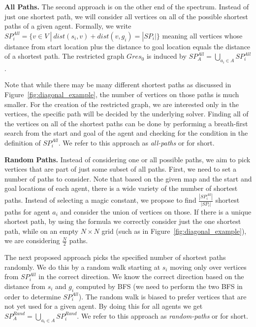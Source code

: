 \textbf{All Paths.}
The second approach is on the other end of the spectrum. Instead of just one shortest path, we will consider all vertices on all of the possible shortest paths of a given agent. Formally, we write $SP_i^{All} = \{ v \in V \: | \: dist(s_i,v) + dist(v,g_i) = |SP_i|\}$ meaning all vertices whose distance from start location plus the distance to goal location equals the distance of a shortest path. The restricted graph $Gres_{0}$ is induced by $SP_A^{All} = \bigcup_{a_i \in A} SP_i^{All}$.

Note that while there may be many different shortest paths as discussed in Figure~\ref{fig:diagonal_example}, the number of vertices on those paths is much smaller. For the creation of the restricted graph, we are interested only in the vertices, the specific path will be decided by the underlying solver. Finding all of the vertices on all of the shortest paths can be done by performing a breath-first search from the start and goal of the agent and checking for the condition in the definition of $SP_i^{All}$. We refer to this approach as \emph{all-paths} or \psa{} for short.




%
\textbf{Random Paths.}
Instead of considering one or all possible paths, we aim to pick vertices that are part of just some subset of all paths. First, we need to set a number of paths to consider. Note that based on the given map and the start and goal locations of each agent, there is a wide variety of the number of shortest paths. Instead of selecting a magic constant, we propose to find $\frac{|SP_i^{All}|}{|SP_i|}$ shortest paths for agent $a_i$ and consider the union of vertices on those. If there is a unique shortest path, by using the formula we correctly consider just the one shortest path, while on an empty $N \times N$ grid (such as in Figure~\ref{fig:diagonal_example}), we are considering $\frac{N}{2}$ paths.

The next proposed approach picks the specified number of shortest paths randomly. We do this by a random walk starting at $s_i$ moving only over vertices from $SP_i^{All}$ in the correct direction. We know the correct direction based on the distance from $s_i$ and $g_i$ computed by BFS (we need to perform the two BFS in order to determine $SP_i^{All}$). The random walk is biased to prefer vertices that are not yet used for a given agent. By doing this for all agents we get $SP_A^{Rand} = \bigcup_{a_i \in A} SP_i^{Rand}$. We refer to this approach as \emph{random-paths} or \psr{} for short.




